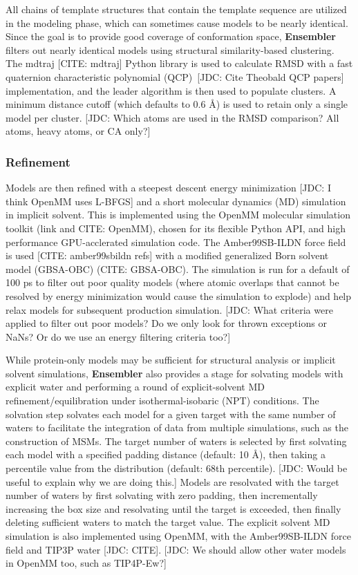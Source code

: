 \documentclass[aps,pre,twocolumn,nofootinbib,superscriptaddress,linenumbers]{revtex4-1}
\begin{document}
All chains of template structures that contain the template sequence are utilized in the modeling phase, which can sometimes cause models to be nearly identical.
Since the goal is to provide good coverage of conformation space, {\bf Ensembler} filters out nearly identical models using structural similarity-based clustering.
The mdtraj {\color{red}[CITE: mdtraj]} Python library is used to calculate RMSD with a fast quaternion characteristic polynomial (QCP)~{\color{red}[JDC: Cite Theobald QCP papers]} implementation, and the leader algorithm is then used to populate clusters.
A minimum distance cutoff (which defaults to 0.6 \AA) is used to retain only a single model per cluster.
{\color{red}[JDC: Which atoms are used in the RMSD comparison?  All atoms, heavy atoms, or CA only?]}

\subsubsection{Refinement}

Models are then refined with a steepest descent energy minimization {\color{red}[JDC: I think OpenMM uses L-BFGS]} and a short molecular dynamics (MD) simulation in implicit solvent.
This is implemented using the OpenMM molecular simulation toolkit (link and CITE: OpenMM), chosen for its flexible Python API, and high performance GPU-acclerated simulation code.
The Amber99SB-ILDN force field is used {\color{red}[CITE: amber99sbildn refs]} with a modified generalized Born solvent model (GBSA-OBC) (CITE: GBSA-OBC).
The simulation is run for a default of 100 ps to filter out poor quality models (where atomic overlaps that cannot be resolved by energy minimization would cause the simulation to explode) and help relax models for subsequent production simulation.
{\color{red}[JDC: What criteria were applied to filter out poor models?  Do we only look for thrown exceptions or NaNs?  Or do we use an energy filtering criteria too?]}

While protein-only models may be sufficient for structural analysis or implicit solvent simulations, {\bf Ensembler} also provides a stage for solvating models with explicit water and performing a round of explicit-solvent MD refinement/equilibration under isothermal-isobaric (NPT) conditions.
The solvation step solvates each model for a given target with the same number of waters to facilitate the integration of data from multiple simulations, such as the construction of MSMs.
The target number of waters is selected by first solvating each model with a specified padding distance (default: 10 \AA), then taking a percentile value from the distribution (default: 68th percentile).
{\color{red}[JDC: Would be useful to explain why we are doing this.]}
Models are resolvated with the target number of waters by first solvating with zero padding, then incrementally increasing the box size and resolvating until the target is exceeded, then finally deleting sufficient waters to match the target value.
The explicit solvent MD simulation is also implemented using OpenMM, with the Amber99SB-ILDN force field and TIP3P water {\color{red}[JDC: CITE]}.
{\color{red}[JDC: We should allow other water models in OpenMM too, such as TIP4P-Ew?]}
\end{document}
